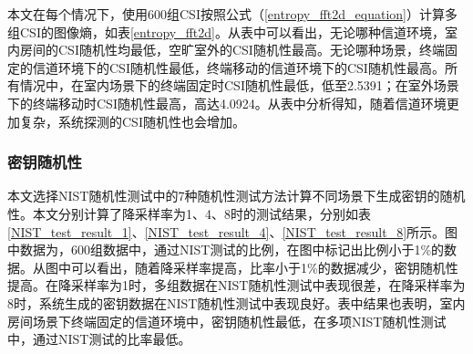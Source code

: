 \documentclass[master]{seuthesis} %
\begin{document}
\begin{Main}
\begin{table}[]
    \centering
    \caption{特殊情况的图像熵值
    \label{entropy_spectial}}
\end{table}

\begin{table}[]
    \centering
    \caption{不同场景的图像熵值
    \label{entropy_fft2d}}
\end{table}

本文在每个情况下，使用600组CSI按照公式（\ref{entropy_fft2d_equation}）计算多组CSI的图像熵，如表\ref{entropy_fft2d}。从表中可以看出，无论哪种信道环境，室内房间的CSI随机性均最低，空旷室外的CSI随机性最高。无论哪种场景，终端固定的信道环境下的CSI随机性最低，终端移动的信道环境下的CSI随机性最高。所有情况中，在室内场景下的终端固定时CSI随机性最低，低至2.5391；在室外场景下的终端移动时CSI随机性最高，高达4.0924。从表中分析得知，随着信道环境更加复杂，系统探测的CSI随机性也会增加。

\subsubsection{密钥随机性}

本文选择NIST随机性测试中的7种随机性测试方法计算不同场景下生成密钥的随机性。本文分别计算了降采样率为1、4、8时的测试结果，分别如表\ref{NIST_test_result_1}、\ref{NIST_test_result_4}、\ref{NIST_test_result_8}所示。图中数据为，600组数据中，通过NIST测试的比例，在图中标记出比例小于1\%的数据。从图中可以看出，随着降采样率提高，比率小于1\%的数据减少，密钥随机性提高。在降采样率为1时，多组数据在NIST随机性测试中表现很差，在降采样率为8时，系统生成的密钥数据在NIST随机性测试中表现良好。表中结果也表明，室内房间场景下终端固定的信道环境中，密钥随机性最低，在多项NIST随机性测试中，通过NIST测试的比率最低。


\end{Main}
\end{document}
